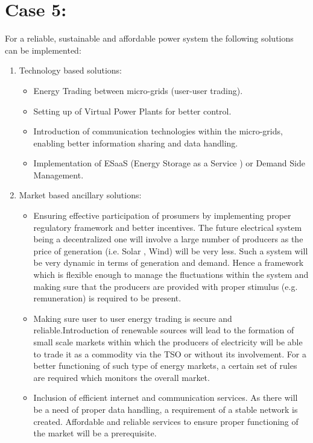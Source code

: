 \section{\textbf{Case 5:}}
For a reliable, sustainable and affordable power system the following solutions can be implemented:
\begin{enumerate}
    \item Technology based solutions:
    \begin{itemize}
        \item Energy Trading between micro-grids (user-user trading).
        \item Setting up of Virtual Power Plants for better control.
        \item Introduction of communication technologies within the micro-grids, enabling better information sharing and data handling.
        \item Implementation of ESaaS (Energy Storage as a Service )
          or Demand Side Management.
    \end{itemize}
    \item Market based ancillary solutions:
    \begin{itemize}
        \item Ensuring effective participation of prosumers by implementing proper regulatory framework and better incentives. The future electrical system being a decentralized one will involve a large number of producers as the price of generation (i.e. Solar , Wind) will be very less. Such a system will be very dynamic in terms of generation and demand. Hence a framework which is flexible enough to manage the fluctuations within the system and making sure that the producers are provided with proper stimulus (e.g. remuneration) is required to be present. 
        \item Making sure user to user energy trading is secure and reliable.Introduction of renewable sources will lead to the formation of small scale markets within which the producers of electricity will be able to trade it as a commodity via the TSO or without its involvement. For a better functioning of such type of energy markets, a certain set of rules are required which monitors the overall market.
        \item Inclusion of efficient internet and communication services. As there will be a need of proper data handling, a requirement of a stable network is created. Affordable and reliable services to ensure proper functioning of the market will be a prerequisite. 
    \end{itemize}
\end{enumerate}
   
